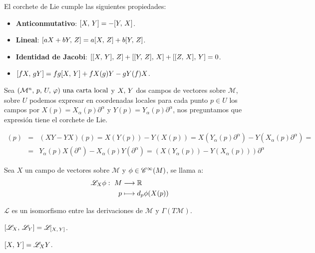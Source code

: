 El corchete de Lie cumple las siguientes propiedades:
\begin{itemize}
	\item \textbf{Anticonmutativo}: $[X,\thinspace Y]=-[Y,\thinspace X]$.
	\item \textbf{Lineal}: $[aX+bY,\thinspace Z]=a[X,\thinspace Z]+b[Y,\thinspace Z]$.
	\item \textbf{Identidad de Jacobi}: $[[X,\thinspace Y],\thinspace Z]+[[Y,\thinspace Z],\thinspace X]+[[Z,\thinspace X],\thinspace Y]=0$.
	\item $[fX,\thinspace gY]=fg[X,\thinspace Y]+fX(g)Y-gY(f)X$.
\end{itemize}

Sea $(\mathcal{M}^n,\thinspace p,\thinspace U,\thinspace \varphi)\textmd{ una carta local}$ y $X,\thinspace Y$ dos campos de vectores sobre $\mathcal{M}$, sobre $U$ podemos expresar en coordenadas
locales para cada punto $p\in U$ los campos por $X(p)=X_\alpha(p)\partial^\alpha$ y $Y(p)=Y_\alpha(p)\partial^\alpha$,
nos preguntamos que expresión tiene el corchete de Lie.

\begin{eqnarray*}
[X\coma Y]
	(p) & = & (XY-YX)(p) = X(Y(p))-Y(X(p))=X(Y_\alpha(p)\partial^\alpha)-Y(X_\alpha(p)
	\partial^\alpha) = \\
	& = & Y_\alpha(p)X(\partial^\alpha)-X_\alpha(p)Y(\partial^\alpha) = (X(Y_\alpha(p))-Y(X_\alpha(p)))\partial^\alpha
\end{eqnarray*}

\begin{definition}
	Sea $X$ un campo de vectores sobre $\mathcal{M}$ y $\phi\in\mathscr{C}^\infty(M)$, se llama  a:
	\begin{equation}
		\label{eq:derivada-lie-funcion-campo}
		\begin{alignedat}{1}
			\mathscr{L}_X \phi:\ M & \longrightarrow \mathbb{R} \\ p & \longmapsto d_p \phi(X(p))
		\end{alignedat}
	\end{equation}
\end{definition}

\begin{result}
	$\mathscr{L}$ es un isomorfismo entre las derivaciones de $\mathcal{M}$ y $\Gamma(T\mathcal{M})$.
\end{result}

\begin{result}
	$[\mathscr{L}_X,\thinspace \mathscr{L}_Y]=\mathscr{L}_{[X,\thinspace Y]}$.
\end{result}

\begin{result}
	$[X,\thinspace Y]=\mathscr{L}_X Y$.
\end{result}

